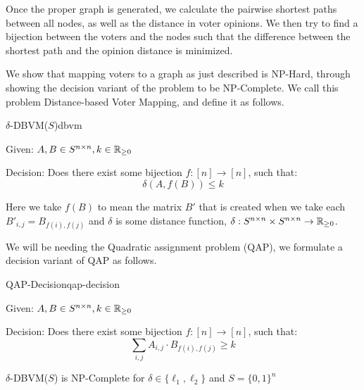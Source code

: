 Once the proper graph is generated, we calculate the pairwise shortest paths between all nodes, as well as the distance in voter opinions. We then try to find a bijection between the voters and the nodes such that the difference between the shortest path and the opinion distance is minimized.

We show that mapping voters to a graph as just described is NP-Hard, through showing the decision variant of the problem to be NP-Complete. We call this problem Distance-based Voter Mapping, and define it as follows.


\begin{problem}{$\delta$-DBVM($S$)}{dbvm}
	{Given: $A, B \in S^{n \times n}, k\in\mathbb{R}_{\geq 0}$

	Decision: Does there exist some bijection $f: [n] \to [n]$, such that: $$\delta(A, f(B)) \leq k$$}

	Here we take $f(B)$ to mean the matrix $B'$ that is created when we take each $B'_{i,j} = B_{f(i),f(j)}$ and  $\delta$ is some distance function, $\delta: {S^{n \times n} \times S^{n \times n} \to \mathbb{R}_{\geq 0}}$.
\end{problem}

We will be needing the Quadratic assignment problem (QAP), we formulate a decision variant of QAP as follows.

\begin{problem}{QAP-Decision}{qap-decision}
	{Given: $A, B \in S^{n \times n}, k\in\mathbb{R}_{\geq 0}$

	Decision: Does there exist some bijection $f: [n] \to [n]$, such that: $$\sum_{i,j} A_{i,j}\cdot B_{f(i),f(j)} \geq k$$}
\end{problem}

\begin{theorem}
	$\delta$-DBVM($S$) is NP-Complete for $\delta\in\{\ell_1, \ell_2\}$ and $S = \{0,1\}^n$
	\label{thm:np_hard_voter_mapping_l2}
\end{theorem}


